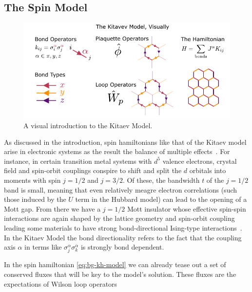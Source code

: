 \hypertarget{the-spin-model}{%
\subsection{The Spin Model}\label{the-spin-model}}

\hypertarget{fig:visual_kitaev_1}{%
\begin{figure}
\centering
\includegraphics[width=1\textwidth,height=\textheight]{figure_code/amk_chapter/visual_kitaev_1}
\caption[{A Visual Intro to the Kitaev Model}]{A visual introduction to the Kitaev Model.}
\label{fig:visual_kitaev_1}
\end{figure}
}

As discussed in the introduction, spin hamiltonians like that of the Kitaev model arise in electronic systems as the result the balance of multiple effects~\autocite{TrebstPhysRep2022}. For instance, in certain transition metal systems with \(d^5\) valence electrons, crystal field and spin-orbit couplings conspire to shift and split the \(d\) orbitals into moments with spin \(j = 1/2\) and \(j = 3/2\). Of these, the bandwidth \(t\) of the \(j= 1/2\) band is small, meaning that even relatively meagre electron correlations (such those induced by the \(U\) term in the Hubbard model) can lead to the opening of a Mott gap. From there we have a \(j = 1/2\) Mott insulator whose effective spin-spin interactions are again shaped by the lattice geometry and spin-orbit coupling leading some materials to have strong bond-directional Ising-type interactions~\autocite{jackeliMottInsulatorsStrong2009,khaliullinOrbitalOrderFluctuations2005}. In the Kitaev Model the bond directionality refers to the fact that the coupling axis \(\alpha\) in terms like \(\sigma_j^{\alpha}\sigma_k^{\alpha}\) is strongly bond dependent.

In the spin hamiltonian \cref{eq:bg-kh-model} we can already tease out a set of conserved fluxes that will be key to the model's solution. These fluxes are the expectations of Wilson loop operators

